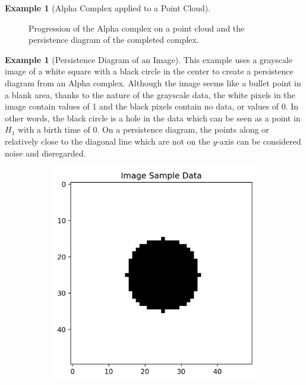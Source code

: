 \documentclass[ma]{uncgdissertationexp}
\theoremstyle{plain}
\theoremstyle{definition}
\newtheorem{example}[theorem]{Example}
\theoremstyle{remark}
\begin{document}
\begin{example}[Alpha Complex applied to a Point Cloud]
\begin{figure}[H]
    \caption{Progression of the Alpha complex on a point cloud and the persistence diagram of the completed complex.}
    \label{fig:point_cloud_alpha_complex}
\end{figure}
\end{example}

\newpage
\begin{example}[Persistence Diagram of an Image]
This example uses a grayscale image of a white square with a black circle in the center to create a persistence diagram from an Alpha complex. Although the image seems like a bullet point in a blank area, thanks to the nature of the grayscale data, the white pixels in the image contain values of 1 and the black pixels contain no data, or values of 0. In other words, the black circle is a hole in the data which can be seen as a point in $H_1$ with a birth time of 0. On a persistence diagram, the points along or relatively close to the diagonal line which are not on the $y$-axis can be considered noise and disregarded.
\begin{figure}[H]
    \centering
    \begin{subfigure}[b]{0.45\textwidth}
        \centering
        \includegraphics[width=\textwidth]{image_data_plot.png}
    \end{subfigure}
    \hfill

\end{figure}
\end{example}
\end{document}
